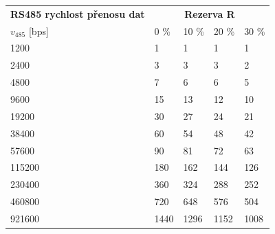 \documentclass{beamer}
\begin{document}
  \begin{frame} {}
	\begin{longtable} {|l|llll|}
		
			\textbf{RS485 rychlost přenosu dat} &       \multicolumn{4}{c|}{\textbf{Rezerva R}}	  	    \\
		
			$v_{485}$ {[bps]}  &	0 \%	&	10 \%	&	20 \%	&	30 \%  \\ \hline
		
			1200~~~ &    1	&    1	&    1	&    1 \\
			2400~~~ &    3	&    3	&    3	&    2 \\
			4800~~~ &    7	&    6	&    6	&    5 \\
			9600~~~ &   15	&   13	&   12	&   10 \\
			19200~~~ &   30	&   27	&   24	&   21 \\
			38400~~~ &   60	&   54	&   48	&   42 \\
			57600~~~ &   90	&   81	&   72	&   63 \\
			115200~~~ &  180	&  162	&  144	&  126 \\
			230400~~~ &  360	&  324	&  288	&  252 \\
			460800~~~ &  720	&  648	&  576	&  504 \\
			921600~~~ & 1440	& 1296	& 1152	& 1008 \\
			\hline
		
		\end{longtable}
		
		


  \end{frame}



  	
%   	 
% 	 
  	
\end{document}
